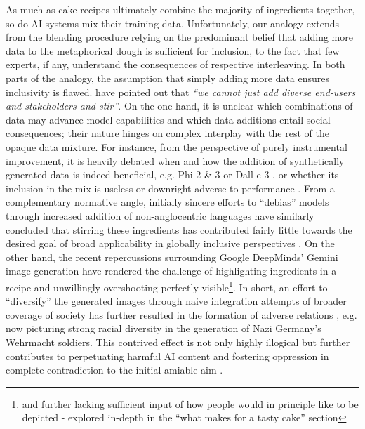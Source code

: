 \documentclass[manuscript,screen,authorversion,nonacm]{acmart}
\begin{document}
As much as cake recipes ultimately combine the majority of ingredients together, so do AI systems mix their training data. Unfortunately, our analogy extends from the blending procedure relying on the predominant belief that adding more data to the metaphorical dough is sufficient for inclusion, to the fact that few experts, if any, understand the consequences of respective interleaving. In both parts of the analogy, the assumption that simply adding more data ensures inclusivity is flawed. 
\citet{Delgado2021diverse_stir} have pointed out that \emph{``we cannot just add diverse end-users and stakeholders and stir''}. 
On the one hand, it is unclear which combinations of data may advance model capabilities and which data additions entail social consequences; their nature hinges on complex interplay with the rest of the opaque data mixture. For instance, from the perspective of purely instrumental improvement, it is heavily debated when and how the addition of synthetically generated data is indeed beneficial, e.g. Phi-2 \& 3 \cite{Javaheripi2023Phi2,Abdin2024Phi3} or Dall-e-3 \cite{Betker2023Dalle3}, or whether its inclusion in the mix is useless or downright adverse to performance \cite{Hao2024Syntheticdataaichallenges}. From a complementary normative angle, initially sincere efforts to ``debias'' models through increased addition of non-anglocentric languages have similarly concluded that stirring these ingredients has contributed fairly little towards the desired goal of broad applicability in globally inclusive perspectives \cite{Friedrich2024multilingualtexttoimagegenerationmagnifies}. On the other hand, the recent repercussions \cite{Raghavan2024GeminiGotItWrong} surrounding Google DeepMinds' Gemini image generation \cite{GoogleGemini2024} have rendered the challenge of highlighting ingredients in a recipe and unwillingly overshooting perfectly visible\footnote{and further lacking sufficient input of how people would in principle like to be depicted - explored in-depth in the ``what makes for a tasty cake'' section}. In short, an effort to ``diversify'' the generated images through naive integration attempts of broader coverage of society has further resulted in the formation of adverse relations \cite{Robertson2024GeminiNaziGen, Gilliard2024GeminiDeeperProblem}, e.g. now picturing strong racial diversity in the generation of Nazi Germany's Wehrmacht soldiers. This contrived effect is not only highly illogical but further contributes to perpetuating harmful AI content and fostering oppression in complete contradiction to the initial amiable aim \cite{Noble2018AlgorithmsOfOppression}.
\end{document}
